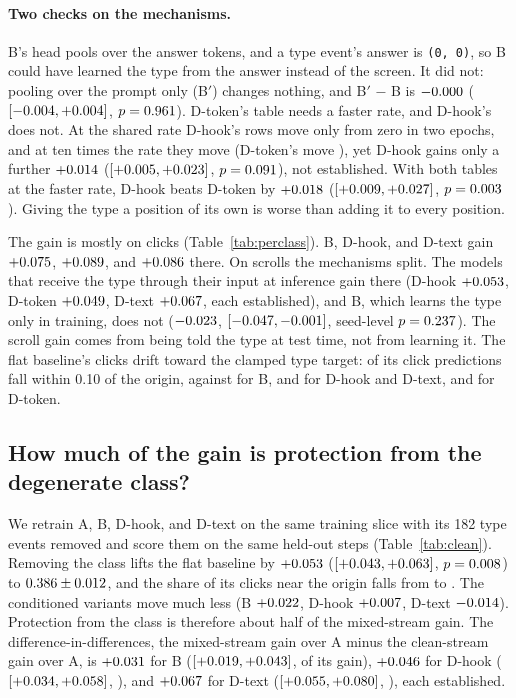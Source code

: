\documentclass[letterpaper]{article} %
\begin{document}
\paragraph{Two checks on the mechanisms.} B's head pools over the answer tokens, and a type event's answer is \texttt{(0, 0)}, so B could have learned the type from the answer instead of the screen. It did not: pooling over the prompt only (B$'$) changes nothing, and B$'$ $-$ B is $-0.000$ ($[-0.004, +0.004]$, $p = 0.961$). D-token's table needs a faster rate, and D-hook's does not. At the shared rate D-hook's rows move only \nRowsDhook{} from zero in two epochs, and at ten times the rate they move \nRowsDhookTen{} (D-token's move \nRowsDtokenTen{}), yet D-hook gains only a further $+0.014$ ($[+0.005, +0.023]$, $p = 0.091$), not established. With both tables at the faster rate, D-hook beats D-token by $+0.018$ ($[+0.009, +0.027]$, $p = 0.003$). Giving the type a position of its own is worse than adding it to every position.



The gain is mostly on clicks (Table~\ref{tab:perclass}). B, D-hook, and D-text gain $+0.075$, $+0.089$, and $+0.086$ there. On scrolls the mechanisms split. The models that receive the type through their input at inference gain there (D-hook $+0.053$, D-token $+0.049$, D-text $+0.067$, each established), and B, which learns the type only in training, does not ($-0.023$, $[-0.047, -0.001]$, seed-level $p = 0.237$). The scroll gain comes from being told the type at test time, not from learning it. The flat baseline's clicks drift toward the clamped type target: \nOrigA{} of its click predictions fall within 0.10 of the origin, against \nOrigB{} for B, \nOrigDhook{} and \nOrigDtext{} for D-hook and D-text, and \nOrigDtokenTen{} for D-token.



\subsection{How much of the gain is protection from the degenerate class?}
\label{sec:diagnosis}
We retrain A, B, D-hook, and D-text on the same training slice with its 182 type events removed and score them on the same held-out steps (Table~\ref{tab:clean}). Removing the class lifts the flat baseline by $+0.053$ ($[+0.043, +0.063]$, $p = 0.008$) to $0.386 \pm 0.012$, and the share of its clicks near the origin falls from \nOrigA{} to \ncOrigA{}. The conditioned variants move much less (B $+0.022$, D-hook $+0.007$, D-text $-0.014$). Protection from the class is therefore about half of the mixed-stream gain. The difference-in-differences, the mixed-stream gain over A minus the clean-stream gain over A, is $+0.031$ for B ($[+0.019, +0.043]$, \ncBshrinkpct{} of its gain), $+0.046$ for D-hook ($[+0.034, +0.058]$, \ncDhookshrinkpct{}), and $+0.067$ for D-text ($[+0.055, +0.080]$, \ncDtextshrinkpct{}), each established.
\end{document}
